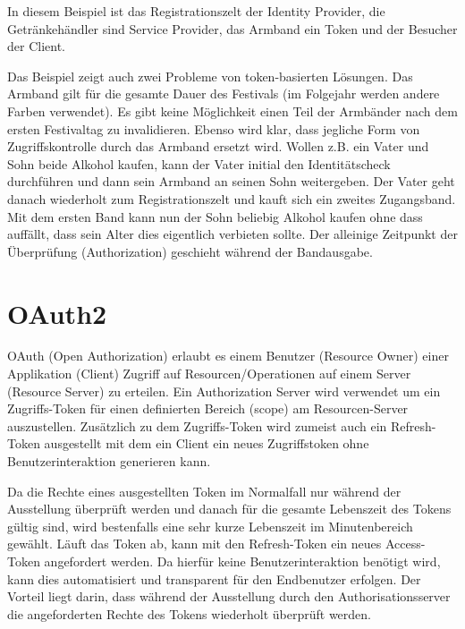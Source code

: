 In diesem Beispiel ist das Registrationszelt der Identity Provider, die Getränkehändler sind Service Provider, das Armband ein Token und der Besucher der Client.

Das Beispiel zeigt auch zwei Probleme von token-basierten Lösungen. Das Armband gilt für die gesamte Dauer des Festivals (im Folgejahr werden andere Farben verwendet). Es gibt keine Möglichkeit einen Teil der Armbänder nach dem ersten Festivaltag zu invalidieren. Ebenso wird klar, dass jegliche Form von Zugriffskontrolle durch das Armband ersetzt wird. Wollen z.B. ein Vater und Sohn beide Alkohol kaufen, kann der Vater initial den Identitätscheck durchführen und dann sein Armband an seinen Sohn weitergeben. Der Vater geht danach wiederholt zum Registrationszelt und kauft sich ein zweites Zugangsband. Mit dem ersten Band kann nun der Sohn beliebig Alkohol kaufen ohne dass auffällt, dass sein Alter dies eigentlich verbieten sollte. Der alleinige Zeitpunkt der Überprüfung (Authorization) geschieht während der Bandausgabe.

\section{OAuth2}

OAuth (Open Authorization) erlaubt es einem Benutzer (Resource Owner) einer Applikation (Client) Zugriff auf Resourcen/Operationen auf einem Server (Resource Server) zu erteilen. Ein Authorization Server wird verwendet um ein Zugriffs-Token für einen definierten Bereich (scope) am Resourcen-Server auszustellen. Zusätzlich zu dem Zugriffs-Token wird zumeist auch ein Refresh-Token ausgestellt mit dem ein Client ein neues Zugriffstoken ohne Benutzerinteraktion generieren kann.

Da die Rechte eines ausgestellten Token im Normalfall nur während der Ausstellung überprüft werden und danach für die gesamte Lebenszeit des Tokens gültig sind, wird bestenfalls eine sehr kurze Lebenszeit im Minutenbereich gewählt. Läuft das Token ab, kann mit den Refresh-Token ein neues Access-Token angefordert werden. Da hierfür keine Benutzerinteraktion benötigt wird, kann dies automatisiert und transparent für den Endbenutzer erfolgen. Der Vorteil liegt darin, dass während der Ausstellung durch den Authorisationsserver die angeforderten Rechte des Tokens wiederholt überprüft werden.


